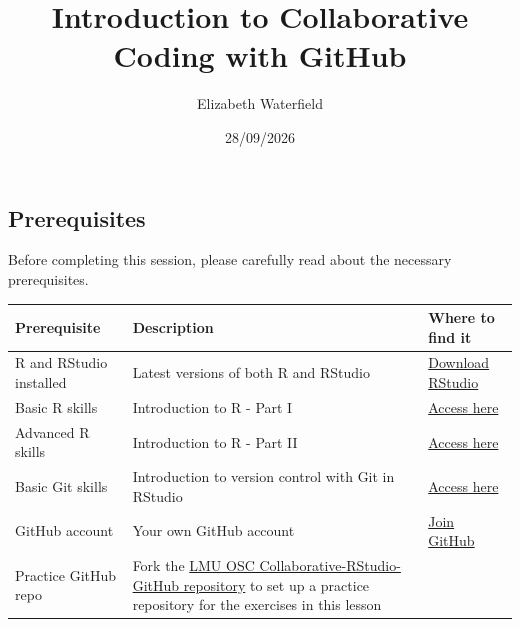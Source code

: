 \documentclass[
  letterpaper,
  DIV=11,
  numbers=noendperiod]{scrartcl}
\title{Introduction to Collaborative Coding with GitHub}
\author{Elizabeth Waterfield}
\date{28/09/2026}
\newcounter{none} %
\begin{document}
\maketitle


\subsection{Prerequisites}\label{prerequisites}

\begin{tcolorbox}[enhanced jigsaw, arc=.35mm, bottomrule=.15mm, bottomtitle=1mm, breakable, colback=white, colbacktitle=quarto-callout-important-color!10!white, colframe=quarto-callout-important-color-frame, coltitle=black, left=2mm, leftrule=.75mm, opacityback=0, opacitybacktitle=0.6, rightrule=.15mm, title=\textcolor{quarto-callout-important-color}{\faExclamation}\hspace{0.5em}{Prerequisites}, titlerule=0mm, toprule=.15mm, toptitle=1mm]

Before completing this session, please carefully read about the
necessary prerequisites.

\end{tcolorbox}

{\def\LTcaptype{none} %
\begin{longtable}[]{@{}
  >{\raggedright\arraybackslash}p{}
  >{\raggedright\arraybackslash}p{}
  >{\raggedright\arraybackslash}p{}@{}}
\toprule\noalign{}
\begin{minipage}[b]{\linewidth}\raggedright
Prerequisite
\end{minipage} & \begin{minipage}[b]{\linewidth}\raggedright
Description
\end{minipage} & \begin{minipage}[b]{\linewidth}\raggedright
Where to find it
\end{minipage} \\
\midrule\noalign{}
\endhead
\bottomrule\noalign{}
\endlastfoot
R and RStudio installed & Latest versions of both R and RStudio &
\href{https://posit.co/download/rstudio-desktop/}{Download RStudio} \\
Basic R skills & Introduction to R - Part I & \href{}{Access here} \\
Advanced R skills & Introduction to R - Part II & \href{}{Access
here} \\
Basic Git skills & Introduction to version control with Git in RStudio &
\href{}{Access here} \\
GitHub account & Your own GitHub account &
\href{https://github.com/join}{Join GitHub} \\
Practice GitHub repo & Fork the
\href{https://github.com/lmu-osc/Collaborative-RStudio-GitHub/tree/main}{LMU
OSC Collaborative-RStudio-GitHub repository} to set up a practice
repository for the exercises in this lesson & \\
\end{longtable}
}
\end{document}
